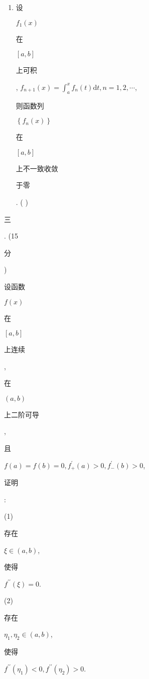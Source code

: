 \documentclass[10pt]{article}
\begin{document}
\begin{enumerate}
  \item \begin{CJK}{UTF8}{mj}设\end{CJK} $f_{1}(x)$ \begin{CJK}{UTF8}{mj}在\end{CJK} $[a, b]$ \begin{CJK}{UTF8}{mj}上可积\end{CJK}, $f_{n+1}(x)=\int_{a}^{x} f_{n}(t) \mathrm{d} t, n=1,2, \cdots$, \begin{CJK}{UTF8}{mj}则函数列\end{CJK} $\left\{f_{n}(x)\right\}$ \begin{CJK}{UTF8}{mj}在\end{CJK} $[a, b]$ \begin{CJK}{UTF8}{mj}上不一致收敛\end{CJK} \begin{CJK}{UTF8}{mj}于零\end{CJK}. ( )

\end{enumerate}
\begin{CJK}{UTF8}{mj}三\end{CJK}. (15 \begin{CJK}{UTF8}{mj}分\end{CJK}) \begin{CJK}{UTF8}{mj}设函数\end{CJK} $f(x)$ \begin{CJK}{UTF8}{mj}在\end{CJK} $[a, b]$ \begin{CJK}{UTF8}{mj}上连续\end{CJK}, \begin{CJK}{UTF8}{mj}在\end{CJK} $(a, b)$ \begin{CJK}{UTF8}{mj}上二阶可导\end{CJK}, \begin{CJK}{UTF8}{mj}且\end{CJK} $f(a)=f(b)=0, f_{+}^{\prime}(a)>0, f_{-}^{\prime}(b)>0$, \begin{CJK}{UTF8}{mj}证明\end{CJK}:

(1) \begin{CJK}{UTF8}{mj}存在\end{CJK} $\xi \in(a, b)$, \begin{CJK}{UTF8}{mj}使得\end{CJK} $f^{\prime \prime}(\xi)=0$.

(2) \begin{CJK}{UTF8}{mj}存在\end{CJK} $\eta_{1}, \eta_{2} \in(a, b)$, \begin{CJK}{UTF8}{mj}使得\end{CJK} $f^{\prime \prime}\left(\eta_{1}\right)<0, f^{\prime \prime}\left(\eta_{2}\right)>0$.
\end{document}
